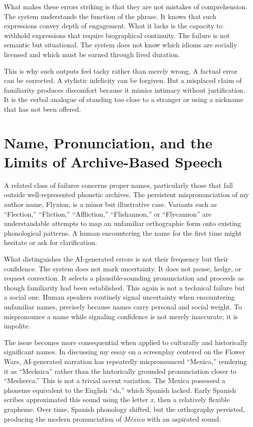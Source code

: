 \documentclass[12pt]{article}
\begin{document}
What makes these errors striking is that they are not mistakes of comprehension. The system understands the function of the phrase. It knows that such expressions convey depth of engagement. What it lacks is the capacity to withhold expressions that require biographical continuity. The failure is not semantic but situational. The system does not know which idioms are socially licensed and which must be earned through lived duration.

This is why such outputs feel tacky rather than merely wrong. A factual error can be corrected. A stylistic infelicity can be forgiven. But a misplaced claim of familiarity produces discomfort because it mimics intimacy without justification. It is the verbal analogue of standing too close to a stranger or using a nickname that has not been offered.

\section{Name, Pronunciation, and the Limits of Archive-Based Speech}

A related class of failures concerns proper names, particularly those that fall outside well-represented phonetic archives. The persistent mispronunciation of my author name, Flyxion, is a minor but illustrative case. Variants such as “Flection,” “Fliction,” “Affliction,” “Flishannon,” or “Flycannon” are understandable attempts to map an unfamiliar orthographic form onto existing phonological patterns. A human encountering the name for the first time might hesitate or ask for clarification.

What distinguishes the AI-generated errors is not their frequency but their confidence. The system does not mark uncertainty. It does not pause, hedge, or request correction. It selects a plausible-sounding pronunciation and proceeds as though familiarity had been established. This again is not a technical failure but a social one. Human speakers routinely signal uncertainty when encountering unfamiliar names, precisely because names carry personal and social weight. To mispronounce a name while signaling confidence is not merely inaccurate; it is impolite.

The issue becomes more consequential when applied to culturally and historically significant names. In discussing my essay on a screenplay centered on the Flower Wars, AI-generated narration has repeatedly mispronounced “Mexica,” rendering it as “Mecksica” rather than the historically grounded pronunciation closer to “Mesheeca.” This is not a trivial accent variation. The Mexica possessed a phoneme equivalent to the English “sh,” which Spanish lacked. Early Spanish scribes approximated this sound using the letter \emph{x}, then a relatively flexible grapheme. Over time, Spanish phonology shifted, but the orthography persisted, producing the modern pronunciation of \emph{México} with an aspirated sound.
\end{document}
